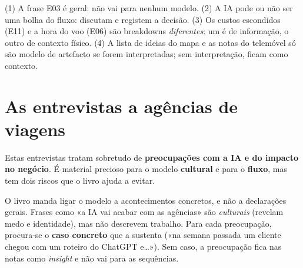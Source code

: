 \documentclass[11pt,a4paper]{article}
\begin{document}
\begin{nota}
(1) A frase E03 é geral: não vai para nenhum modelo. (2) A IA pode ou não ser uma bolha do fluxo: discutam e registem a decisão. (3) Os custos escondidos (E11) e a hora do voo (E06) são breakdowns \emph{diferentes}: um é de informação, o outro de contexto físico. (4) A lista de ideias do mapa e as notas do telemóvel só são modelo de artefacto se forem interpretadas; sem interpretação, ficam como contexto.
\end{nota}

\section{As entrevistas a agências de viagens}
\label{sec:agentes}

Estas entrevistas tratam sobretudo de \textbf{preocupações com a IA e do impacto no negócio}. É material precioso para o modelo \textbf{cultural} e para o \textbf{fluxo}, mas tem dois riscos que o livro ajuda a evitar.

\begin{aviso}
O livro manda ligar o modelo a acontecimentos concretos, e não a declarações gerais. Frases como «a IA vai acabar com as agências» são \emph{culturais} (revelam medo e identidade), mas não descrevem trabalho. Para cada preocupação, procura-se o \textbf{caso concreto} que a sustenta («na semana passada um cliente chegou com um roteiro do ChatGPT e\ldots»). Sem caso, a preocupação fica nas notas como \emph{insight} e não vai para as sequências.
\end{aviso}
\end{document}
